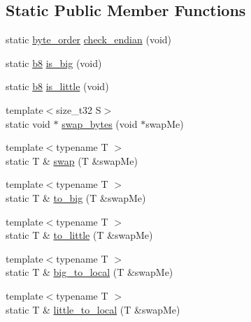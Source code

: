 \subsection*{Static Public Member Functions}
\begin{DoxyCompactItemize}
\item 
static \hyperlink{classcrap_1_1endian_acd655732bc1be1cbc7614225510b06bc}{byte\-\_\-order} \hyperlink{classcrap_1_1endian_af4512bbd3646a2adb93f8e347cb91316}{check\-\_\-endian} (void)
\item 
static \hyperlink{types_8h_a74eb47b4ab9e428eab7b91b3b877fa6c}{b8} \hyperlink{classcrap_1_1endian_ac3f40e46feb16e0f256e0d575310a304}{is\-\_\-big} (void)
\item 
static \hyperlink{types_8h_a74eb47b4ab9e428eab7b91b3b877fa6c}{b8} \hyperlink{classcrap_1_1endian_a1929d0b6d0fedf95e5ba224491fb73fa}{is\-\_\-little} (void)
\item 
{\footnotesize template$<$size\-\_\-t32 S$>$ }\\static void $\ast$ \hyperlink{classcrap_1_1endian_abb379815661f1c0bf53ff127a9e46ad2}{swap\-\_\-bytes} (void $\ast$swap\-Me)
\item 
{\footnotesize template$<$typename T $>$ }\\static T \& \hyperlink{classcrap_1_1endian_a90a0d30226be6645977d2a92e3e25eb8}{swap} (T \&swap\-Me)
\item 
{\footnotesize template$<$typename T $>$ }\\static T \& \hyperlink{classcrap_1_1endian_a27273ac66da4bcb19b9d25487e3339fd}{to\-\_\-big} (T \&swap\-Me)
\item 
{\footnotesize template$<$typename T $>$ }\\static T \& \hyperlink{classcrap_1_1endian_a74048f1ce4f5b78d758e9aa5e65e0bda}{to\-\_\-little} (T \&swap\-Me)
\item 
{\footnotesize template$<$typename T $>$ }\\static T \& \hyperlink{classcrap_1_1endian_ac455ef06416404e0e602fe5058249a76}{big\-\_\-to\-\_\-local} (T \&swap\-Me)
\item 
{\footnotesize template$<$typename T $>$ }\\static T \& \hyperlink{classcrap_1_1endian_a1acfd2485f4d14dce347366aa89732b3}{little\-\_\-to\-\_\-local} (T \&swap\-Me)
\end{DoxyCompactItemize}


